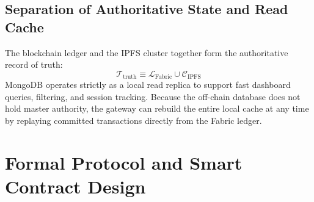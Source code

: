 \documentclass[conference]{IEEEtran}
\begin{document}
\subsection{Separation of Authoritative State and Read Cache}
The blockchain ledger and the IPFS cluster together form the authoritative record of truth:
\begin{equation}
    \mathcal{T}_{\text{truth}} \equiv \mathcal{L}_{\text{Fabric}} \cup \mathcal{C}_{\text{IPFS}}
\end{equation}
MongoDB operates strictly as a local read replica to support fast dashboard queries, filtering, and session tracking. Because the off-chain database does not hold master authority, the gateway can rebuild the entire local cache at any time by replaying committed transactions directly from the Fabric ledger.

\section{Formal Protocol and Smart Contract Design}
\end{document}
